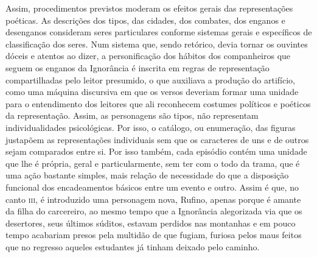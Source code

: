 Assim, procedimentos previstos moderam os efeitos gerais das representações
poéticas.  As descrições dos tipos, das cidades, dos combates, dos enganos e
desenganos consideram seres particulares conforme sistemas gerais e específicos
de classificação dos seres.  Num sistema que, sendo retórico, devia tornar os
ouvintes dóceis e atentos ao dizer, a personificação dos hábitos dos
companheiros que seguem os enganos da Ignorância é inscrita em regras de
representação compartilhadas pelo leitor presumido, o que auxiliava a produção
do artifício, como uma máquina discursiva em que os versos deveriam formar uma
unidade para o entendimento dos leitores que ali reconhecem costumes políticos e
poéticos da representação. Assim, as personagens são tipos, não representam
individualidades psicológicas. Por isso, o catálogo, ou enumeração, das figuras
justapõem as representações individuais sem que os caracteres de uns e de outros
sejam comparados entre si. Por isso também, cada episódio contém uma unidade que
lhe é própria, geral e particularmente, sem ter com o todo da trama, que é uma
ação bastante simples, mais relação de necessidade do que  a disposição funcional dos encadeamentos básicos entre um evento e outro. Assim é que, no canto
\textsc{iii}, é introduzido uma personagem nova, Rufino, apenas porque é amante
da filha do carcereiro, ao mesmo tempo que a Ignorância alegorizada via que os
desertores, seus últimos súditos, estavam perdidos nas montanhas e em pouco
tempo acabariam presos pela multidão de que fugiam, furiosa pelos maus feitos
que no regresso aqueles estudantes já tinham deixado pelo caminho. 


